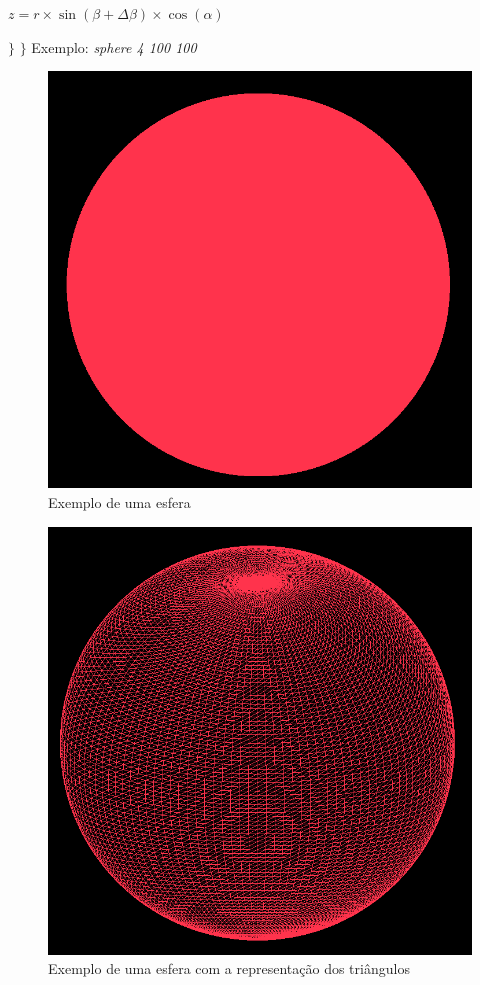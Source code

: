 \documentclass{article}
\begin{document}
\par$z = r\times\sin(\beta + \Delta\beta)\times\cos(\alpha)$ \newline
\par $\}$ \newline
$\}$
\newpage
Exemplo: \textit{sphere 4 100 100}
\begin{figure}[H]
\centering\includegraphics[scale=0.35]{esfera4} 
\caption{\label{fig:controller}Exemplo de uma esfera}
\end{figure} \begin{figure}[H]
\centering\includegraphics[scale=0.35]{esfera3} 
\caption{\label{fig:controller}Exemplo de uma esfera com a representação dos triângulos}
\end{figure}
\newpage
\end{document}
